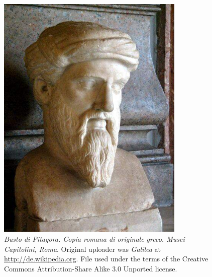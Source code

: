 \begin{figure}[h]
  \begin{center}
      \includegraphics[width=0.8\textwidth]{photos/pythagoras.jpg}
    \end{center}
    \caption{\emph{Busto di Pitagora. Copia romana di originale greco. Musei Capitolini, Roma}.
    Original uploader was \emph{Galilea} at \url{http://de.wikipedia.org}.
    File used under the terms of the Creative Commons Attribution-Share Alike 3.0 Unported license.}
  \label{fig:bustofpythagoras}
\end{figure}
